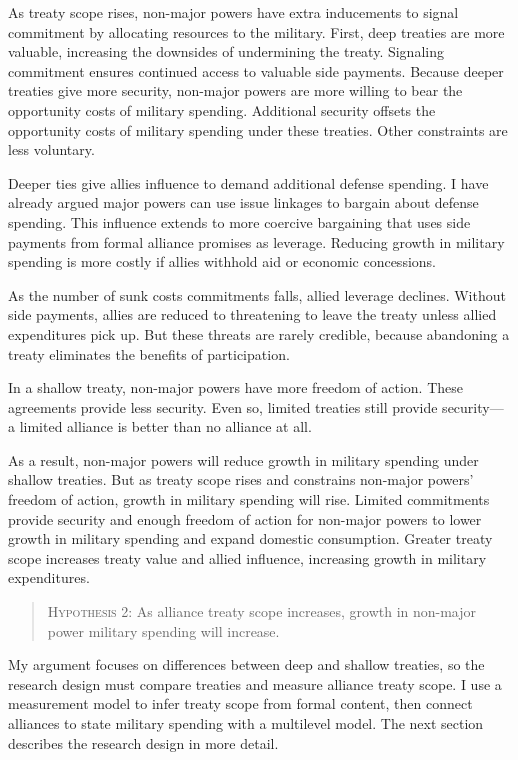 \documentclass[12pt]{article}
\begin{document}
As treaty scope rises, non-major powers have extra inducements to signal commitment by allocating resources to the military.
First, deep treaties are more valuable, increasing the downsides of undermining the treaty. 
Signaling commitment ensures continued access to valuable side payments.   
Because deeper treaties give more security, non-major powers are more willing to bear the opportunity costs of military spending. 
Additional security offsets the opportunity costs of military spending under these treaties.
Other constraints are less voluntary.   


Deeper ties give allies influence to demand additional defense spending. 
I have already argued major powers can use issue linkages to bargain about defense spending. 
This influence extends to more coercive bargaining that uses side payments from formal alliance promises as leverage. 
Reducing growth in military spending is more costly if allies withhold aid or economic concessions. 


As the number of sunk costs commitments falls, allied leverage declines. 
Without side payments, allies are reduced to threatening to leave the treaty unless allied expenditures pick up. 
But these threats are rarely credible, because abandoning a treaty eliminates the benefits of participation. 


In a shallow treaty, non-major powers have more freedom of action.  
These agreements provide less security.  
Even so, limited treaties still provide security--- a limited alliance is better than no alliance at all. 


As a result, non-major powers will reduce growth in military spending under shallow treaties. 
But as treaty scope rises and constrains non-major powers' freedom of action, growth in military spending will rise. 
Limited commitments provide security and enough freedom of action for non-major powers to lower growth in military spending and expand domestic consumption. 
Greater treaty scope increases treaty value and allied influence, increasing growth in military expenditures. 


\begin{quote}
\textsc{Hypothesis 2}: As alliance treaty scope increases, growth in non-major power military spending will increase. 
\end{quote}


My argument focuses on differences between deep and shallow treaties, so the research design must compare treaties and measure alliance treaty scope.  
I use a measurement model to infer treaty scope from formal content, then connect alliances to state military spending with a multilevel model. 
The next section describes the research design in more detail. 
\end{document}
